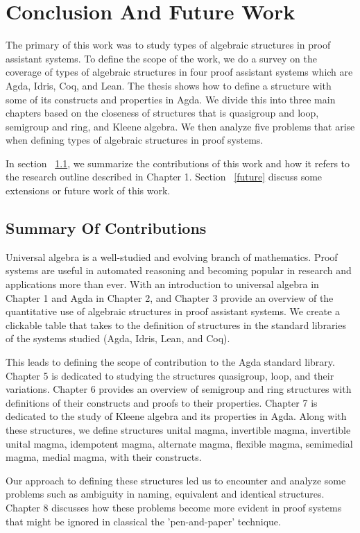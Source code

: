 \chapter{Conclusion And Future Work}
The primary of this work was to study types of algebraic structures in proof
assistant systems. To define the scope of the work, we do a survey on the
coverage of types of algebraic structures in four proof assistant systems which
are Agda, Idris, Coq, and Lean. The thesis shows how to define a structure with
some of its constructs and properties in Agda. We divide this into three main
chapters based on the closeness of structures that is quasigroup and loop,
semigroup and ring, and Kleene algebra. We then analyze five problems that arise
when defining types of algebraic structures in proof systems.

In section ~\ref{contribution}, we summarize the contributions of this work and
how it refers to the research outline described in Chapter 1. Section
~\ref{future} discuss some extensions or future work of this work. 

\section{Summary Of Contributions}
\label{contribution}
Universal algebra is a well-studied and evolving branch of mathematics. Proof
systems are useful in automated reasoning and becoming popular in research and
applications more than ever. With an introduction to universal algebra in
Chapter 1 and Agda in Chapter 2, and Chapter 3 provide an overview of the
quantitative use of algebraic structures in proof assistant systems. We create a
clickable table that takes to the definition of structures in the standard
libraries of the systems studied (Agda, Idris, Lean, and Coq).

This leads to defining the scope of contribution to the Agda standard library.
Chapter 5 is dedicated to studying the structures quasigroup, loop, and their
variations. Chapter 6 provides an overview of semigroup and ring structures with
definitions of their constructs and proofs to their properties. Chapter 7 is
dedicated to the study of Kleene algebra and its properties in Agda. Along with
these structures, we define structures unital magma, invertible magma,
invertible unital magma, idempotent magma, alternate magma, flexible magma,
semimedial magma, medial magma, with their constructs.

Our approach to defining these structures led us to encounter and analyze some
problems such as ambiguity in naming, equivalent and identical structures.
Chapter 8 discusses how these problems become more evident in proof systems that
might be ignored in classical the 'pen-and-paper' technique.

